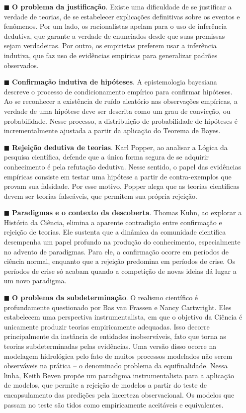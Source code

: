 \documentclass[./main.tex]{subfiles}
\begin{document}
\begin{itemize}
    \item[$\blacksquare$] \textbf{O problema da justificação}. Existe uma dificuldade de se justificar a verdade de teorias, de se estabelecer explicações definitivas sobre os eventos e fenômenos. Por um lado, os racionalistas apelam para o uso de inferência dedutiva, que garante a verdade de enunciados desde que suas premissas sejam verdadeiras. Por outro, os empiristas preferem usar a inferência indutiva, que faz uso de evidências empíricas para generalizar padrões observados.
    \item  [$\blacksquare$] \textbf{Confirmação indutiva de hipóteses}. A epistemologia bayesiana descreve o processo de condicionamento empírico para confirmar hipóteses. Ao se reconhecer a existência de ruído aleatório nas observações empíricas, a verdade de uma hipótese deve ser descrita como um grau de convicção, ou probabilidade. Nesse processo, a distribuição de probabilidade de hipóteses é incrementalmente ajustada a partir da aplicação do Teorema de Bayes. 
    \item[$\blacksquare$] \textbf{Rejeição dedutiva de teorias}. Karl Popper, ao analisar a Lógica da pesquisa científica, defende que a única forma segura de se adquirir conhecimento é pela refutação dedutiva. Nesse sentido, o papel das evidências empíricas consiste em testar uma hipótese a partir de contra-exemplos que provam sua falsidade. Por esse motivo, Popper alega que as teorias científicas devem ser teorias falseáveis, que permitem sua própria rejeição.  
    \item     [$\blacksquare$] \textbf{Paradigmas e o contexto da descoberta}. Thomas Kuhn, ao explorar a História da Ciência, elimina a aparente contradição entre confirmação e rejeição de teorias. Ele sustenta que a dinâmica da comunidade científica desempenha um papel profundo na produção do conhecimento, especialmente no advento de paradigmas. Para ele, a confirmação ocorre em períodos de ciência normal, enquanto que a rejeição predomina em períodos de crise. Os períodos de crise só acabam quando a competição de novas ideias dá lugar a um novo paradigma.
    \item[$\blacksquare$] \textbf{O problema da subdeterminação}. O realismo científico é profundamente questionado por Bas van Frassen e Nancy Cartwright. Eles estabelecem uma perspectiva instrumentalista, em que o objetivo da Ciência é unicamente produzir teorias empiricamente adequadas. Isso decorre principalmente da instância de entidades inobserváveis, fato que torna as teorias subdeterminadas pelas evidências. Uma versão disso ocorre na modelagem hidrológica pelo fato de muitos processos modelados não serem observáveis na prática -- o denominado problema da equifinalidade. Nessa linha, Keith Beven propõe um paradigma instrumentalista para a aplicação de modelos, que permite a rejeição de modelos a partir do teste de encapsulamento das predições pela incerteza observacional. Os modelos que passam no teste são tidos como empiricamente aceitáveis e equivalentes.  
\end{itemize}
\end{document}
